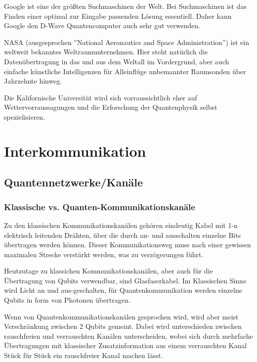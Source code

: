 Google ist eine der größten Suchmaschinen der Welt. Bei Suchmaschinen ist das Finden einer optimal zur Eingabe passenden Lösung essentiell. Daher kann Google den D-Wave Quantencomputer auch sehr gut verwenden.

NASA (ausgesprochen ''National Aeronautics and Space Administration'') ist ein weltweit bekanntes Weltraumunternehmen. Hier steht natürlich die Datenübertragung in das und aus dem Weltall im Vordergrund, aber auch einfache künstliche Intelligenzen für Alleinflüge unbemannter Raumsonden über Jahrzehnte hinweg.

Die Kalifornische Universität wird sich vorraussichtlich eher auf Wettervorraussagungen und die Erforschung der Quantenphysik selbst spezielisieren.

\newpage

\section{Interkommunikation}
\label{sec:interkommunikation}

\subsection{Quantennetzwerke/Kanäle}
\label{sec:Quantennetzwerke/Kanaele}

\subsubsection{Klassische vs. Quanten-Kommunikationskanäle}
\label{sec:Klassische vs. Quanten-Kommunikationskanaele}

Zu den klassischen Kommunikationskanälen gehören eindeutig Kabel mit 1-n elektrisch leitenden Drähten, über die durch an- und ausschalten einzelne Bits übertragen werden können. Dieser Kommunikationsweg muss nach einer gewissen maximalen Strecke verstärkt werden, was zu verzögerungen führt.

Heutzutage zu klassichen Kommunikationskanälen, aber auch für die Übertragung von Qubits verwendbar, sind Glasfaserkabel. Im Klassischen Sinne wird Licht an und aus-geschalten, für Quantenkommunikation werden einzelne Qubits in form von Photonen übertragen.

Wenn von Quantenkommunikationskanälen gesprochen wird, wird aber meist Verschränkung zwischen 2 Qubits gemeint. Dabei wird unterschieden zwischen rauschfreien und verrauschten Kanälen unterscheiden, wobei sich durch mehrfache Übertragungen mit klassischer Zusatzinformation aus einem verrauschten Kanal Stück für Stück ein rauschfreier Kanal machen lässt.



